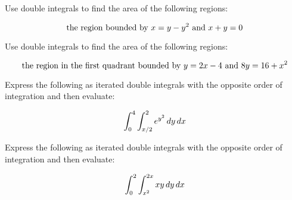 \documentclass[12pt,letterpaper]{hmcpset}
\begin{document}
\begin{problem}[3.a]

    Use double integrals to find the area of the following regions:

    \[
        \text {the region bounded by } x= y -y^2 \text { and } x +y = 0\\
    \]

\end{problem}

\begin{solution}

\end{solution}

\begin{problem}[3.b]

    Use double integrals to find the area of the following regions:

    \[
        \text {the region in the first quadrant bounded by } y = 2x -4 \text { and } 8y = 16 + x^2\\
    \]

\end{problem}

\begin{solution}

\end{solution}

\begin{problem}[4.a]

    Express the following as iterated double integrals with the opposite order of integration and then evaluate:

    \[
        \int_{0}^{4} \int_{x/2}^{2} e^{y^2}\,dy\,dx\\
    \]

\end{problem}

\begin{solution}

\end{solution}

\begin{problem}[4.b]

    Express the following as iterated double integrals with the opposite order of integration and then evaluate:

    \[
        \int_{0}^{2} \int_{x^2}^{2x} xy\,dy\,dx\\
    \]

\end{problem}

\begin{solution}
\end{solution}
\end{document}
